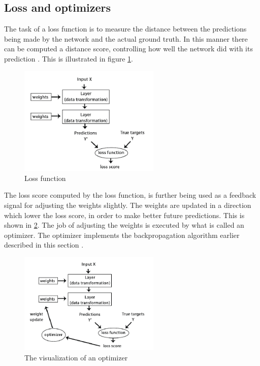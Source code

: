 \documentclass[USenglish]{ifimaster}  %
\begin{document}
\subsection{Loss and optimizers}
The task of a loss function is to measure the distance between the predictions being made by the network and the actual ground truth. In this manner there can be computed a distance score, controlling how well the network did with its prediction \cite{Francois_Deep_learning_with_python}. This is illustrated in figure \cref{fig:loss_function}.

\begin{figure}[H]
    \centering
    \includegraphics[width=0.6\textwidth]{bilder/loss_function.png}
    \caption{Loss function \cite{Francois_Deep_learning_with_python}}
    \label{fig:loss_function}
\end{figure}
The loss score computed by the loss function, is further being used as a feedback signal for adjusting the weights slightly. The weights are updated in a direction which lower the loss score, in order to make better future predictions. This is shown in \cref{fig:optimizers}. The job of adjusting the weights is executed by what is called an optimizer. The optimizer implements the backpropagation algorithm earlier described in this section \cite{Francois_Deep_learning_with_python}. 

\begin{figure}[H]
    \centering
    \includegraphics[width=0.6\textwidth]{bilder/optimizers.png}
    \caption{The visualization of an optimizer \cite{Francois_Deep_learning_with_python}}
    \label{fig:optimizers}
\end{figure}
\end{document}
